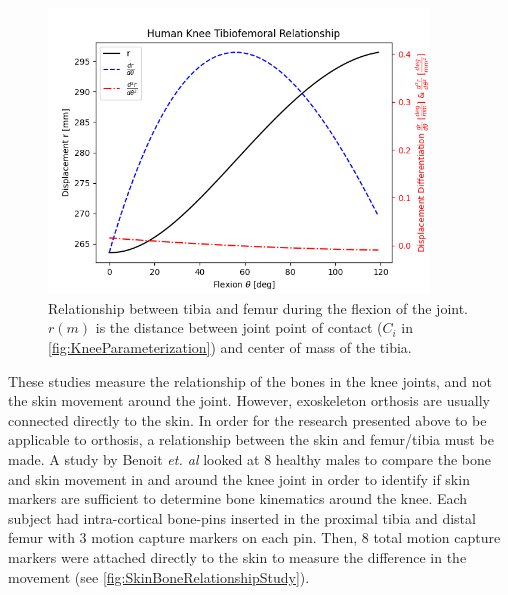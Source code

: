 \begin{figure}[ht!]
    \centering
    \includegraphics[width=0.9\textwidth]{Figures/Background/FlexionCurve.png}
    \caption{Relationship between tibia and femur during the flexion of the joint. \(r(m)\) is the distance between joint point of contact (\(C_i\) in \autoref{fig:KneeParameterization}) and center of mass of the tibia.}
    \label{fig:KneeFlexionCurve}
\end{figure}

These studies measure the relationship of the bones in the knee joints, and not the skin movement around the joint. However, exoskeleton orthosis are usually connected directly to the skin. In order for the research presented above to be applicable to orthosis, a relationship between the skin and femur/tibia must be made. A study by Benoit \textit{et. al} looked at 8 healthy males to compare the bone and skin movement in and around the knee joint in order to identify if skin markers are sufficient to determine bone kinematics around the knee. Each subject had intra-cortical bone-pins inserted in the proximal tibia and distal femur with 3 motion capture markers on each pin. Then, 8 total motion capture markers were attached directly to the skin to measure the difference in the movement (see \autoref{fig:SkinBoneRelationshipStudy}). 

